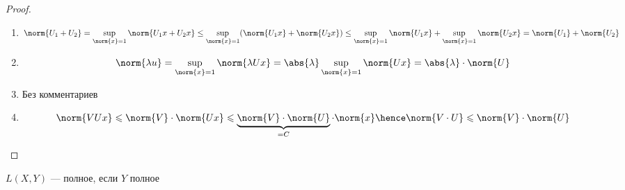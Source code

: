 \begin{proof}
   \begin{enumerate}
       \item 
       \[
           \norm{U_1 + U_2} = \sup_{\norm{x} = 1}\norm{U_1x + U_2x} \le
           \sup_{\norm{x}=1}(\norm{U_1 x} + \norm{U_2 x}) \le
           \sup_{\norm{x}=1}\norm{U_1 x} + \sup_{\norm{x} = 1}\norm{U_2 x} = \norm{U_1} + \norm{U_2}
       \]
       \item \[
           \norm{\lambda u} = \sup_{\norm{x} = 1} {\norm{\lambda Ux}} = \abs{\lambda} \sup_{\norm{x} = 1}{\norm{Ux}} = \abs{\lambda} \cdot \norm{U}
       \]

       \item Без комментариев
       
       \item \[
           \norm{VUx} \leqslant \norm{V} \cdot \norm{Ux} \leqslant \underbrace{\norm{V} \cdot \norm{U} }_{ = C}  \cdot \norm{x} \hence \norm{V \cdot U} \leqslant \norm{V} \cdot \norm{U}
       \]
   \end{enumerate} 
        

\end{proof}



\begin{theorem}
    $L(X, Y)$ --- полное, если $Y$ полное
\end{theorem}


